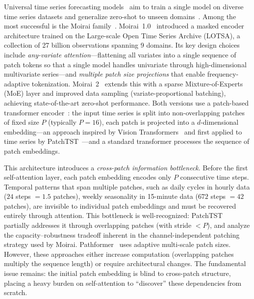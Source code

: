 \documentclass[11pt]{article}
\begin{document}
Universal time series forecasting models~\citep{woo2024unified,das2024decoder,ansari2024chronos,rasul2024lagllama,goswami2024moment,garza2024timegpt,liu2024timer,ekambaram2024ttm} aim to train a single model on diverse time series datasets and generalize zero-shot to unseen domains~\citep{bommasani2021opportunities,liang2024foundation}. Among the most successful is the Moirai family~\citep{woo2024unified,liu2024moirai2}. Moirai~1.0~\citep{woo2024unified} introduced a masked encoder architecture trained on the Large-scale Open Time Series Archive (LOTSA), a collection of 27 billion observations spanning 9 domains. Its key design choices include \emph{any-variate attention}---flattening all variates into a single sequence of patch tokens so that a single model handles univariate through high-dimensional multivariate series---and \emph{multiple patch size projections} that enable frequency-adaptive tokenization. Moirai~2~\citep{liu2024moirai2} extends this with a sparse Mixture-of-Experts (MoE) layer and improved data sampling (variate-proportional batching), achieving state-of-the-art zero-shot performance. Both versions use a patch-based transformer encoder~\citep{vaswani2017attention}: the input time series is split into non-overlapping patches of fixed size $P$ (typically $P=16$), each patch is projected into a $d$-dimensional embedding---an approach inspired by Vision Transformers~\citep{dosovitskiy2021image} and first applied to time series by PatchTST~\citep{nie2023patchtst}---and a standard transformer processes the sequence of patch embeddings.

This architecture introduces a \emph{cross-patch information bottleneck}. Before the first self-attention layer, each patch embedding encodes only $P$ consecutive time steps. Temporal patterns that span multiple patches, such as daily cycles in hourly data ($24$ steps $= 1.5$ patches), weekly seasonality in 15-minute data ($672$ steps $= 42$ patches), are invisible to individual patch embeddings and must be recovered entirely through attention. This bottleneck is well-recognized: PatchTST~\citep{nie2023patchtst} partially addresses it through overlapping patches (with stride $< P$), and \citet{han2024capacity} analyze the capacity--robustness tradeoff inherent in the channel-independent patching strategy used by Moirai. Pathformer~\citep{zhang2024crossformer} uses adaptive multi-scale patch sizes. However, these approaches either increase computation (overlapping patches multiply the sequence length) or require architectural changes. The fundamental issue remains: the initial patch embedding is blind to cross-patch structure, placing a heavy burden on self-attention to ``discover'' these dependencies from scratch.
\end{document}
